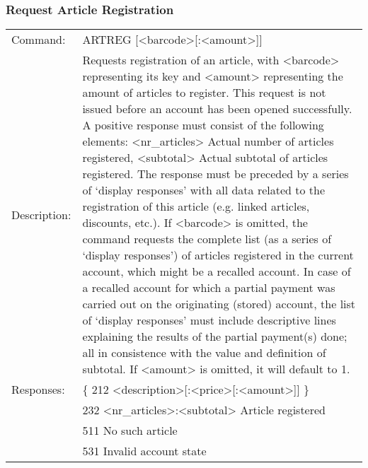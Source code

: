 \subsubsection*{Request Article Registration}
\begin{tabular}{lp{350px}}
Command: & ARTREG [<barcode>[:<amount>]] \\
Description: & Requests registration of an article, with <barcode> representing its key and <amount> representing the amount of articles to register. This request is not issued before an account has been opened successfully. A positive response must consist of the following elements: <nr\_articles> Actual number of articles registered, <subtotal>  Actual subtotal of articles registered. The response must be preceded by a series of `display responses' with all data related to the registration of this article (e.g. linked articles, discounts, etc.). If <barcode> is omitted, the command requests the complete list (as a series of `display responses') of articles registered in the current account, which might be a recalled account. In case of a recalled account for which a partial payment was carried out on the originating (stored) account, the list of `display responses' must include descriptive lines explaining the results of the partial payment(s) done; all in consistence with the value and definition of subtotal. If <amount> is omitted, it will default to 1. \\
Responses: & \{ 212 <description>[:<price>[:<amount>]] \} \\
& 232 <nr\_articles>:<subtotal> Article registered \\
& 511 No such article \\
& 531 Invalid account state
\end{tabular}

